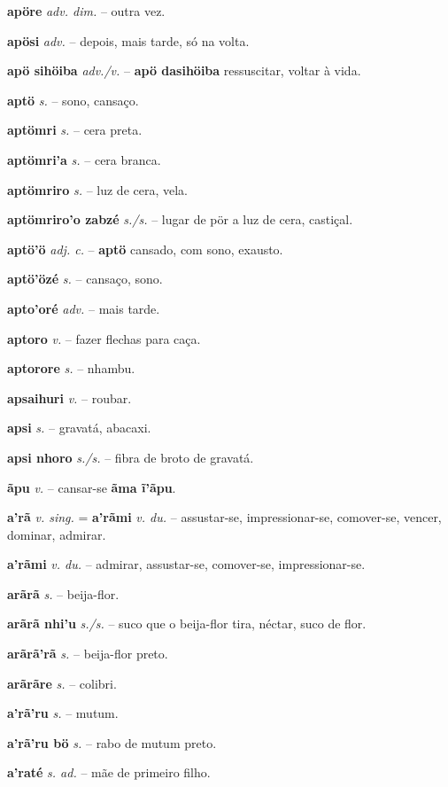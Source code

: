 \textbf{apöre} \textit{adv. dim.} -- outra vez.

\textbf{apösi} \textit{adv.} -- depois, mais tarde, só na volta.

\textbf{apö sihöiba} \textit{adv./v.} -- \textbf{apö dasihöiba} ressuscitar, voltar à vida.

\textbf{aptö} \textit{s.} -- sono, cansaço.

\textbf{aptömri} \textit{s.} -- cera preta.

\textbf{aptömri'a} \textit{s.} -- cera branca.

\textbf{aptömriro} \textit{s.} -- luz de cera, vela.

\textbf{aptömriro'o zabzé} \textit{s./s.} -- lugar de pör a luz de cera, castiçal.

\textbf{aptö'ö} \textit{adj. c.} -- \textbf{aptö} cansado, com sono, exausto.

\textbf{aptö'özé} \textit{s.} -- cansaço, sono.

\textbf{apto'oré} \textit{adv.} -- mais tarde.

\textbf{aptoro} \textit{v.} -- fazer flechas para caça.

\textbf{aptorore} \textit{s.} -- nhambu.

\textbf{apsaihuri} \textit{v.} -- roubar.

\textbf{apsi} \textit{s.} -- gravatá, abacaxi.

\textbf{apsi nhoro} \textit{s./s.} -- fibra de broto de gravatá.

\textbf{ãpu} \textit{v.} -- cansar-se  \textbf{ãma ĩ'ãpu}.

\textbf{a'rã} \textit{v. sing.} = \textbf{a'rãmi} \textit{v. du.} -- assustar-se, impressionar-se, comover-se, vencer, dominar, admirar.

\textbf{a'rãmi} \textit{v. du.} -- admirar, assustar-se, comover-se, impressionar-se.

\textbf{arãrã} \textit{s.} -- beija-flor.

\textbf{arãrã nhi'u} \textit{s./s.} -- suco que o beija-flor tira, néctar, suco de flor.

\textbf{arãrã'rã} \textit{s.} -- beija-flor preto.

\textbf{arãrãre} \textit{s.} -- colibri.

\textbf{a'rã'ru} \textit{s.} -- mutum.

\textbf{a'rã'ru bö} \textit{s.} -- rabo de mutum preto.

\textbf{a'raté} \textit{s. ad.} -- mãe de primeiro filho.

